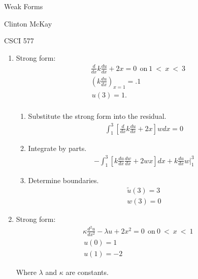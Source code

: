 \documentclass{article}[12pt]%
\begin{document}
\begin{flushright}
Weak Forms

Clinton McKay 

CSCI 577
\end{flushright}

\begin{enumerate}
    \item Strong form:
    \begin{align*} 
        \frac{d}{dx}k\frac{du}{dx} + 2x = 0~~\mathrm{on}~\mathrm{1} ~<~ x ~ < ~ \mathrm{3}\\
        \left( k\frac{du}{dx}\right)_{x=\mathrm{1}} = .1\\
        \frac{}{}u(\mathrm{3}) = \mathrm{1}.\\
    \end{align*}
    \begin{enumerate}
        \item Substitute the strong form into the residual. 
        \begin{align*}
          \int^3_1\left[\frac{d}{dx}k\frac{du}{dx} + 2x\right]wdx = 0  
        \end{align*}
        \item Integrate by parts. 
        \begin{align*}
            -\int^3_1\left[k\frac{du}{dx}\frac{dw}{dx} + 2wx\right]dx + k\frac{du}{dx}w \Big|^3_1
        \end{align*}
        \item Determine boundaries.
        \begin{align*}
            \widetilde{u}(3) = 3\\
            w(3) = 0
        \end{align*}
    \end{enumerate}
    
    \item Strong form:
    \begin{align*}
        \kappa \frac{d^2 u}{dx^2} - \lambda u + 2x^2 = 0~~\mathrm{on}~\mathrm{0} ~<~ x ~ < ~ \mathrm{1}\\
        \frac{}{}u(0) = 1\\
        \frac{}{}u(1) = -2
    \end{align*}

    Where $\lambda$ and $\kappa$ are constants.


\end{enumerate}
\end{document}
